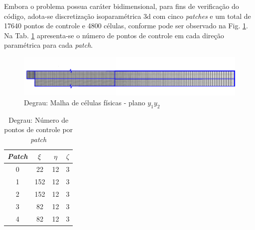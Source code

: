 \documentclass[tese_patricia]{subfiles}
\begin{document}
Embora o problema possua caráter bidimensional, para fins de verificação do código, adota-se discretização isoparamétrica 3d com cinco \textit{patches} e um total de 17640 pontos de controle e 4800 células, conforme pode ser observado na Fig. \ref{fig:degrau_malha}. Na Tab. \ref{tab:degrau_discretização_patches} apresenta-se o número de pontos de controle em cada direção paramétrica para cada \textit{patch}. 


\begin{figure}[htb!]
	\centering
	\includegraphics[scale=2.0,trim=0cm 0.1cm 0cm 0cm, clip=true]{Imagens/Cap3/degrau_malha.pdf}
		\vspace{-0.5cm} 
	\caption{Degrau: Malha de células físicas - plano $y_1$$y_2$}
	\label{fig:degrau_malha}
\end{figure}

\begin{center}
	\begin{table}[h!]
		\caption{Degrau: Número de pontos de controle por \textit{patch}}
		\centering
		\begin{tabular}{|c | c | c| c|} 
			\hline
			\textit{Patch} & $\xi$ & $\eta$ & $\zeta$ \\ 
			\hline
			0 & 22 & 12 & 3 \\ 
			\hline
			1 & 152 & 12 & 3\\
			\hline
			2 & 152 & 12 & 3\\
			\hline
			3 & 82 & 12 & 3\\
			\hline
			4 & 82 & 12 & 3\\
			\hline
		\end{tabular}
		\label{tab:degrau_discretização_patches}
	\end{table}
\end{center}
\end{document}
